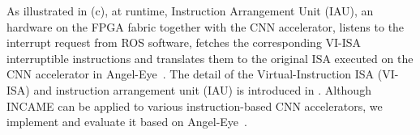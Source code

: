 As illustrated in (c), at runtime, Instruction Arrangement Unit (IAU), an hardware on the FPGA fabric together with the CNN accelerator, listens to the interrupt request from ROS software, fetches the corresponding VI-ISA interruptible instructions and translates them to the original ISA executed on the CNN accelerator in Angel-Eye~\cite{guo2017angel}. 
The detail of the Virtual-Instruction ISA (VI-ISA) and instruction arrangement unit (IAU) is introduced in . 
Although INCAME can be applied to various instruction-based CNN accelerators, we implement and evaluate it based on Angel-Eye~\cite{guo2017angel}.

